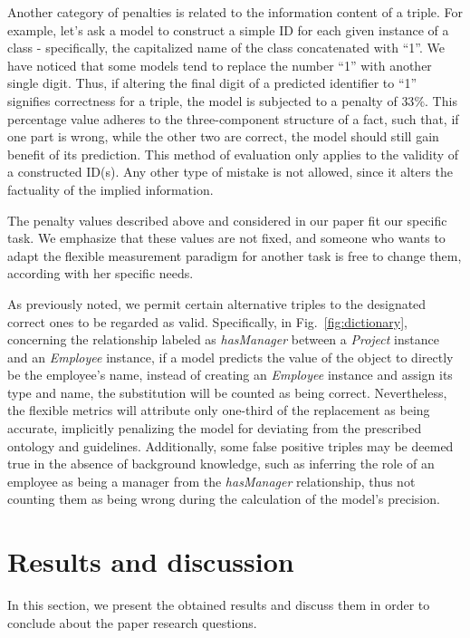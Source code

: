 \documentclass[runningheads]{llncs}
\begin{document}
Another category of penalties is related to the information content of a triple. For example, let's ask a model to construct a simple ID for each given instance of a class - specifically, the capitalized name of the class concatenated with “1”. We have noticed that some models tend to replace the number “1” with another single digit. Thus, if altering the final digit of a predicted identifier to “1” signifies correctness for a triple, the model is subjected to a penalty of $33\%$.  This percentage  value adheres to the three-component structure of a fact, such that, if one part is wrong, while the other two are correct, the model should still gain benefit of its prediction. This method of evaluation only applies to the validity of a constructed ID(s). Any other type of mistake is not allowed, since it alters the factuality of the implied information.

The penalty values described above and considered in our paper fit our specific task. We emphasize that these values are not fixed, and someone who wants to adapt the flexible measurement paradigm for another task is free to change them, according with her specific needs.

As previously noted, we permit certain alternative triples to the designated correct ones to be regarded as valid. Specifically, in Fig.~\ref{fig:dictionary}, concerning the relationship labeled as \textit{hasManager} between a \textit{Project} instance and an \textit{Employee} instance, if a model predicts the value of the object to directly be the employee’s name, instead of creating an \textit{Employee} instance and assign its type and name, the substitution will be counted as being correct. Nevertheless, the flexible metrics will attribute only one-third of the replacement as being accurate, implicitly penalizing the model for deviating from the prescribed ontology and guidelines. Additionally, some false positive triples may be deemed true in the absence of background knowledge, such as inferring the role of an employee as being a manager from the \textit{hasManager} relationship, thus not counting them as being wrong during the calculation of the model’s precision.

\section{Results and discussion}
\label{seq:discussion}

In this section, we present the obtained results and discuss them in order to conclude about the paper research questions.
\end{document}
